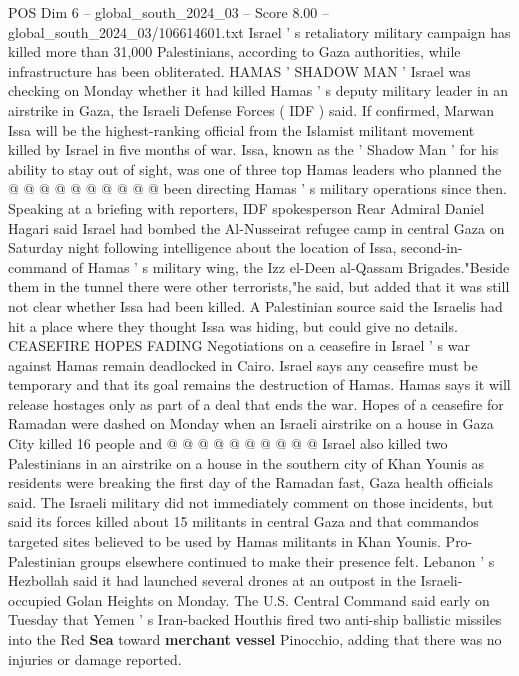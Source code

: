 \begin{textsample}{POS Dim 6 – global\_south\_2024\_03 – Score 8.00 – global\_south\_2024\_03/106614601.txt}
Israel ' s retaliatory military campaign has killed more than 31,000 Palestinians, according to Gaza authorities, while infrastructure has been obliterated.
HAMAS ' SHADOW MAN ' Israel was checking on Monday whether it had killed Hamas ' s deputy military leader in an airstrike in Gaza, the Israeli Defense Forces ( IDF ) said.
If confirmed, Marwan Issa will be the highest-ranking official from the Islamist militant movement killed by Israel in five months of war.
Issa, known as the ' Shadow Man ' for his ability to stay out of sight, was one of three top Hamas leaders who planned the @ @ @ @ @ @ @ @ @ @ been directing Hamas ' s military operations since then.
Speaking at a briefing with reporters, IDF spokesperson Rear Admiral Daniel Hagari said Israel had bombed the Al-Nusseirat refugee camp in central Gaza on Saturday night following intelligence about the location of Issa, second-in-command of Hamas ' s military wing, the Izz el-Deen al-Qassam Brigades."Beside them in the tunnel there were other terrorists,"he said, but added that it was still not clear whether Issa had been killed.
A Palestinian source said the Israelis had hit a place where they thought Issa was hiding, but could give no details.
CEASEFIRE HOPES FADING Negotiations on a ceasefire in Israel ' s war against Hamas remain deadlocked in Cairo.
Israel says any ceasefire must be temporary and that its goal remains the destruction of Hamas.
Hamas says it will release hostages only as part of a deal that ends the war.
Hopes of a ceasefire for Ramadan were dashed on Monday when an Israeli airstrike on a house in Gaza City killed 16 people and @ @ @ @ @ @ @ @ @ @ Israel also killed two Palestinians in an airstrike on a house in the southern city of Khan Younis as residents were breaking the first day of the Ramadan fast, Gaza health officials said.
The Israeli military did not immediately comment on those incidents, but said its forces killed about 15 militants in central Gaza and that commandos targeted sites believed to be used by Hamas militants in Khan Younis.
Pro-Palestinian groups elsewhere continued to make their presence felt.
Lebanon ' s Hezbollah said it had launched several drones at an outpost in the Israeli-occupied Golan Heights on Monday.
The U.S.
Central Command said early on Tuesday that Yemen ' s Iran-backed Houthis fired two anti-ship ballistic missiles into the Red \textbf{Sea} toward \textbf{merchant} \textbf{vessel} Pinocchio, adding that there was no injuries or damage reported.

\end{textsample}
